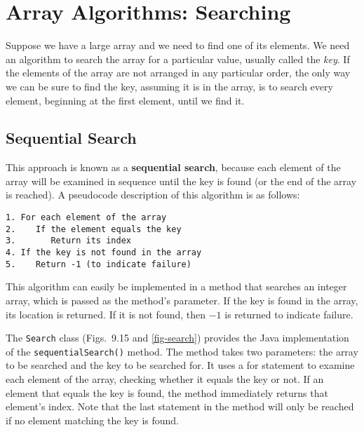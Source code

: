 \section{Array Algorithms: Searching}
\noindent Suppose we have a large array and we need to find one of its
elements.  We need an algorithm to search the array for a particular
value, usually called the {\it key}. If the elements of the array are
not arranged in any particular order, the only way we can be sure to
find the key, assuming it is in the array, is to search every element,
beginning at the first element, until we find it.


\subsection{Sequential Search}
\noindent This approach is known as a {\bf sequential
search}, because each element of the array will be examined in
sequence until the key is found (or the end of the array is
reached). A pseudocode description of this algorithm is as follows:

\begin{jjjlisting}
\begin{lstlisting}
1. For each element of the array
2.    If the element equals the key
3.       Return its index
4. If the key is not found in the array
5.    Return -1 (to indicate failure)
\end{lstlisting}
\end{jjjlisting}

This algorithm can easily be implemented in a method that searches an
integer array, which is passed as the method's parameter.  If the key
is found in the array, its location is returned.  If it is not found,
then $-1$ is returned to indicate failure.


The {\tt Search} class (Figs.~9.15 and \ref{fig-search})
provides the Java implementation of the {\tt sequentialSearch()} method.
The method takes two parameters: the array to be searched and the key
to be searched for.  It uses a for statement to examine each element
of the array, checking whether it equals the key or not.  If an
element that equals the key is found, the method immediately returns
that element's index.  Note that the last statement in the method will
only be reached if no element matching the key is found.

